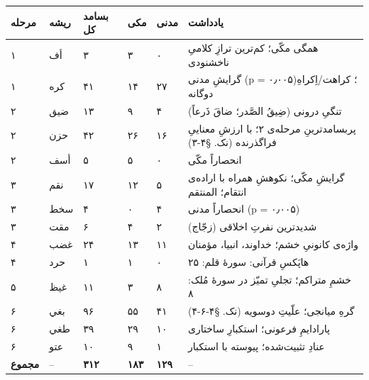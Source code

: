 \begin{RTL}
\begin{otherlanguage}{persian}
\begin{longtable}[]{@{}
  >{\centering\arraybackslash}p{}
  >{\centering\arraybackslash}p{}
  >{\centering\arraybackslash}p{}
  >{\centering\arraybackslash}p{}
  >{\centering\arraybackslash}p{}
  >{\raggedright\arraybackslash}p{}@{}}
\toprule\noalign{}
\begin{minipage}[b]{\linewidth}\centering
مرحله
\end{minipage} & \begin{minipage}[b]{\linewidth}\centering
ریشه
\end{minipage} & \begin{minipage}[b]{\linewidth}\centering
بسامد کل
\end{minipage} & \begin{minipage}[b]{\linewidth}\centering
مکی
\end{minipage} & \begin{minipage}[b]{\linewidth}\centering
مدنی
\end{minipage} & \begin{minipage}[b]{\linewidth}\raggedright
یادداشت
\end{minipage} \\
\midrule\noalign{}
\endhead
\bottomrule\noalign{}
\endlastfoot
۱ & أف & ۳ & ۳ & ۰ & همگی مکّی؛ کم‌ترین ترازِ کلامیِ ناخشنودی \\
۱ & کره & ۴۱ & ۱۴ & ۲۷ & گرایشِ مدنی (p = ۰٫۰۰۵)؛ کراهت/اِکراهِ دوگانه \\
۲ & ضيق & ۱۳ & ۹ & ۴ & تنگیِ درونی (ضِيقُ الصَّدر؛ ضاقَ ذَرعاً) \\
۲ & حزن & ۴۲ & ۲۶ & ۱۶ & پربسامدترینِ مرحله‌ی ۲؛ با ارزشِ معناییِ فراگذرنده
(نک. §۴-۳) \\
۲ & أسف & ۵ & ۵ & ۰ & انحصاراً مکّی \\
۳ & نقم & ۱۷ & ۱۲ & ۵ & گرایشِ مکّی؛ نکوهشِ همراه با اراده‌ی انتقام؛
المنتقم \\
۳ & سخط & ۴ & ۰ & ۴ & انحصاراً مدنی (p = ۰٫۰۰۵) \\
۳ & مقت & ۶ & ۴ & ۲ & شدیدترین نفرتِ اخلاقی (زجّاج) \\
۴ & غضب & ۲۴ & ۱۳ & ۱۱ & واژه‌ی کانونیِ خشم؛ خداوند، انبیا، مؤمنان \\
۴ & حرد & ۱ & ۱ & ۰ & هاپَکسِ قرآنی: سورۀ قلم: ۲۵ \\
۵ & غيظ & ۱۱ & ۳ & ۸ & خشمِ متراکم؛ تجلیِ تمیّز در سورۀ مُلک: ۸ \\
۶ & بغي & ۹۶ & ۵۵ & ۴۱ & گرهِ میانجی؛ علّیتِ دوسویه (نک. §۴-۶-۴) \\
۶ & طغي & ۳۹ & ۲۹ & ۱۰ & پارادایمِ فرعونی؛ استکبارِ ساختاری \\
۶ & عتو & ۱۰ & ۹ & ۱ & عنادِ تثبیت‌شده؛ پیوسته با استکبار \\
\textbf{مجموع} & -- & \textbf{۳۱۲} & \textbf{۱۸۳} & \textbf{۱۲۹} & -- \\
\end{longtable}


\end{otherlanguage}
\end{RTL}
